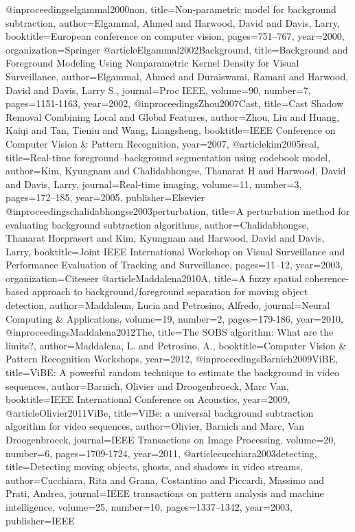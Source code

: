 \documentclass[]{article}
\begin{document}
@inproceedings{elgammal2000non,
	title={Non-parametric model for background subtraction},
	author={Elgammal, Ahmed and Harwood, David and Davis, Larry},
	booktitle={European conference on computer vision},
	pages={751--767},
	year={2000},
	organization={Springer}
}
@article{Elgammal2002Background,
	title={Background and Foreground Modeling Using Nonparametric Kernel Density for Visual Surveillance},
	author={Elgammal, Ahmed and Duraiswami, Ramani and Harwood, David and Davis, Larry S.},
	journal={Proc IEEE},
	volume={90},
	number={7},
	pages={1151-1163},
	year={2002},
}
@inproceedings{Zhou2007Cast,
	title={Cast Shadow Removal Combining Local and Global Features},
	author={Zhou, Liu and Huang, Kaiqi and Tan, Tieniu and Wang, Liangsheng},
	booktitle={IEEE Conference on Computer Vision & Pattern Recognition},
	year={2007},
}
@article{kim2005real,
	title={Real-time foreground--background segmentation using codebook model},
	author={Kim, Kyungnam and Chalidabhongse, Thanarat H and Harwood, David and Davis, Larry},
	journal={Real-time imaging},
	volume={11},
	number={3},
	pages={172--185},
	year={2005},
	publisher={Elsevier}
}
@inproceedings{chalidabhongse2003perturbation,
	title={A perturbation method for evaluating background subtraction algorithms},
	author={Chalidabhongse, Thanarat Horprasert and Kim, Kyungnam and Harwood, David and Davis, Larry},
	booktitle={Joint IEEE International Workshop on Visual Surveillance and Performance Evaluation of Tracking and Surveillance},
	pages={11--12},
	year={2003},
	organization={Citeseer}
}
@article{Maddalena2010A,
	title={A fuzzy spatial coherence-based approach to background/foreground separation for moving object detection},
	author={Maddalena, Lucia and Petrosino, Alfredo},
	journal={Neural Computing & Applications},
	volume={19},
	number={2},
	pages={179-186},
	year={2010},
}
@inproceedings{Maddalena2012The,
	title={The SOBS algorithm: What are the limits?},
	author={Maddalena, L. and Petrosino, A.},
	booktitle={Computer Vision & Pattern Recognition Workshops},
	year={2012},
}
@inproceedings{Barnich2009ViBE,
	title={ViBE: A powerful random technique to estimate the background in video sequences},
	author={Barnich, Olivier and Droogenbroeck, Marc Van},
	booktitle={IEEE International Conference on Acoustics},
	year={2009},
}
@article{Olivier2011ViBe,
	title={ViBe: a universal background subtraction algorithm for video sequences},
	author={Olivier, Barnich and Marc, Van Droogenbroeck},
	journal={IEEE Transactions on Image Processing},
	volume={20},
	number={6},
	pages={1709-1724},
	year={2011},
}
@article{cucchiara2003detecting,
	title={Detecting moving objects, ghosts, and shadows in video streams},
	author={Cucchiara, Rita and Grana, Costantino and Piccardi, Massimo and Prati, Andrea},
	journal={IEEE transactions on pattern analysis and machine intelligence},
	volume={25},
	number={10},
	pages={1337--1342},
	year={2003},
	publisher={IEEE}
}
\end{document}
